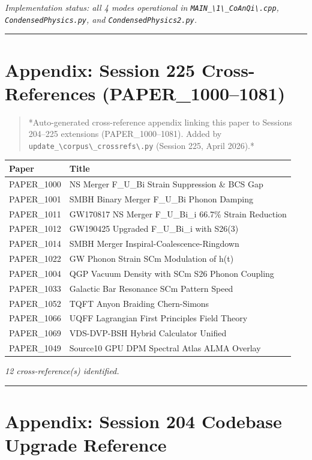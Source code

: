 \documentclass[12pt,a4paper]{article}
\begin{document}
\emph{Implementation status: all 4 modes operational in \texttt{MAIN\_\textbackslash {1\textbackslash \_CoAnQi\textbackslash }.cpp}, \texttt{CondensedPhysics.py}, and \texttt{CondensedPhysics2.py}.}

\medskip\hrule\medskip

\section{Appendix: Session 225 Cross-References (PAPER\_1000--1081)}

\begin{quote}
*Auto-generated cross-reference appendix linking this paper to
Sessions 204--225 extensions (PAPER\_1000--1081). Added by
\texttt{update\_\textbackslash {corpus\textbackslash \_crossrefs\textbackslash }.py} (Session 225, April 2026).*
\end{quote}

\begin{table}[H]
\centering
\small
\begin{tabularx}{\linewidth}{@{}>{\raggedright\arraybackslash}X>{\raggedright\arraybackslash}X@{}}
\toprule
Paper & Title \tabularnewline
\midrule
PAPER\_1000 & NS Merger F\_{U\_Bi} Strain Suppression \& BCS Gap \tabularnewline
PAPER\_1001 & SMBH Binary Merger F\_{U\_Bi} Phonon Damping \tabularnewline
PAPER\_1011 & GW170817 NS Merger F\_{U\_Bi\_i} 66.7\% Strain Reduction \tabularnewline
PAPER\_1012 & GW190425 Upgraded F\_{U\_Bi\_i} with S26(3) \tabularnewline
PAPER\_1014 & SMBH Merger Inspiral-Coalescence-Ringdown \tabularnewline
PAPER\_1022 & GW Phonon Strain SCm Modulation of h(t) \tabularnewline
PAPER\_1004 & QGP Vacuum Density with SCm S26 Phonon Coupling \tabularnewline
PAPER\_1033 & Galactic Bar Resonance SCm Pattern Speed \tabularnewline
PAPER\_1052 & TQFT Anyon Braiding Chern-Simons \tabularnewline
PAPER\_1066 & UQFF Lagrangian First Principles Field Theory \tabularnewline
PAPER\_1069 & VDS-DVP-BSH Hybrid Calculator Unified \tabularnewline
PAPER\_1049 & Source10 GPU DPM Spectral Atlas ALMA Overlay \tabularnewline
\bottomrule
\end{tabularx}
\end{table}

\emph{12 cross-reference(s) identified.}

\medskip\hrule\medskip

\section{Appendix: Session 204 Codebase Upgrade Reference}
\end{document}
